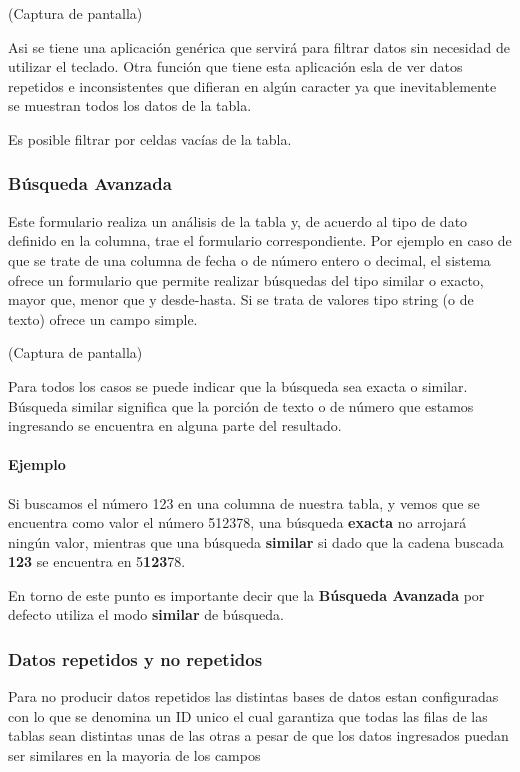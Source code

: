 \documentclass[a4paper,10pt]{article}
\begin{document}
(Captura de pantalla)

Asi se tiene una aplicación genérica que servirá para filtrar datos sin necesidad de utilizar el teclado. Otra función que tiene esta aplicación esla de ver datos repetidos e inconsistentes que difieran en algún caracter ya que inevitablemente se muestran todos los datos de la tabla.

Es posible filtrar por celdas vacías de la tabla. 


\subsubsection{Búsqueda Avanzada}

Este formulario realiza un análisis de la tabla y, de acuerdo al tipo de dato definido en la columna, trae el formulario correspondiente. Por ejemplo en caso de que se trate de una columna de fecha o de número entero o decimal, el sistema ofrece un formulario que permite realizar búsquedas del tipo similar o exacto, mayor que, menor que y desde-hasta. Si se trata de valores tipo string (o de texto) ofrece un campo simple.

(Captura de pantalla)

Para todos los casos se puede indicar que la búsqueda sea exacta o similar. Búsqueda similar significa que la porción de texto o de número que estamos ingresando se encuentra en alguna parte del resultado.

\paragraph{Ejemplo} Si buscamos el número 123 en una columna de nuestra tabla, y vemos que se encuentra como valor el número 512378, una búsqueda \textbf{exacta} no arrojará ningún valor, mientras que una búsqueda \textbf{similar} si dado que la cadena buscada \textbf{123} se encuentra en 5\textbf{123}78.

En torno de este punto es importante decir que la \textbf{Búsqueda Avanzada} por defecto utiliza el modo \textbf{similar} de búsqueda.

\subsubsection{Datos repetidos y no repetidos}

Para no producir datos repetidos las distintas bases de datos estan configuradas con lo que se denomina un ID unico el cual garantiza que todas las filas de las tablas sean distintas unas de las otras a pesar de que los datos ingresados puedan ser similares en la mayoria de los campos 
\end{document}

